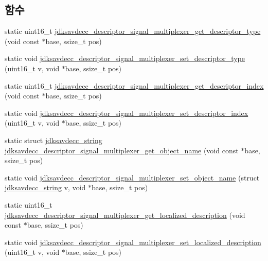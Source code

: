 \subsection*{함수}
\begin{DoxyCompactItemize}
\item 
static uint16\+\_\+t \hyperlink{group__descriptor__signal__multiplexer_ga0c13f523d4d52e809c05e094f584b548}{jdksavdecc\+\_\+descriptor\+\_\+signal\+\_\+multiplexer\+\_\+get\+\_\+descriptor\+\_\+type} (void const $\ast$base, ssize\+\_\+t pos)
\item 
static void \hyperlink{group__descriptor__signal__multiplexer_gae8063469ca2ca12533da43c70e96caab}{jdksavdecc\+\_\+descriptor\+\_\+signal\+\_\+multiplexer\+\_\+set\+\_\+descriptor\+\_\+type} (uint16\+\_\+t v, void $\ast$base, ssize\+\_\+t pos)
\item 
static uint16\+\_\+t \hyperlink{group__descriptor__signal__multiplexer_ga04e4ecc31acd2d444667139173a93fd4}{jdksavdecc\+\_\+descriptor\+\_\+signal\+\_\+multiplexer\+\_\+get\+\_\+descriptor\+\_\+index} (void const $\ast$base, ssize\+\_\+t pos)
\item 
static void \hyperlink{group__descriptor__signal__multiplexer_gadac09d1ef21ba14109a80559310be8f0}{jdksavdecc\+\_\+descriptor\+\_\+signal\+\_\+multiplexer\+\_\+set\+\_\+descriptor\+\_\+index} (uint16\+\_\+t v, void $\ast$base, ssize\+\_\+t pos)
\item 
static struct \hyperlink{structjdksavdecc__string}{jdksavdecc\+\_\+string} \hyperlink{group__descriptor__signal__multiplexer_gaed83802ef9894fd05eb11213b7d885a3}{jdksavdecc\+\_\+descriptor\+\_\+signal\+\_\+multiplexer\+\_\+get\+\_\+object\+\_\+name} (void const $\ast$base, ssize\+\_\+t pos)
\item 
static void \hyperlink{group__descriptor__signal__multiplexer_gabcf68f5e1d3b811a5f20c4a38259ba34}{jdksavdecc\+\_\+descriptor\+\_\+signal\+\_\+multiplexer\+\_\+set\+\_\+object\+\_\+name} (struct \hyperlink{structjdksavdecc__string}{jdksavdecc\+\_\+string} v, void $\ast$base, ssize\+\_\+t pos)
\item 
static uint16\+\_\+t \hyperlink{group__descriptor__signal__multiplexer_ga02b6ea6db82e485169a9bf1916699a04}{jdksavdecc\+\_\+descriptor\+\_\+signal\+\_\+multiplexer\+\_\+get\+\_\+localized\+\_\+description} (void const $\ast$base, ssize\+\_\+t pos)
\item 
static void \hyperlink{group__descriptor__signal__multiplexer_ga44f805522fed23de078407a8f555b108}{jdksavdecc\+\_\+descriptor\+\_\+signal\+\_\+multiplexer\+\_\+set\+\_\+localized\+\_\+description} (uint16\+\_\+t v, void $\ast$base, ssize\+\_\+t pos)

\end{DoxyCompactItemize}
